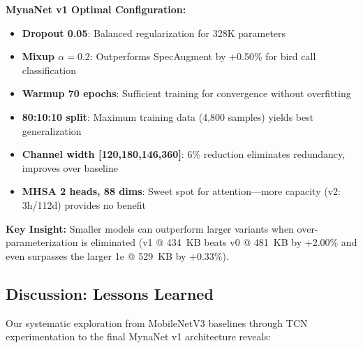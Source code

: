 \documentclass[conference]{IEEEtran}
\begin{document}
\noindent\textbf{MynaNet v1 Optimal Configuration:}
\begin{itemize}
    \item \textbf{Dropout 0.05}: Balanced regularization for 328K parameters
    \item \textbf{Mixup $\alpha=0.2$}: Outperforms SpecAugment by +0.50\% for bird call classification
    \item \textbf{Warmup 70 epochs}: Sufficient training for convergence without overfitting
    \item \textbf{80:10:10 split}: Maximum training data (4,800 samples) yields best generalization
    \item \textbf{Channel width [120,180,146,360]}: 6\% reduction eliminates redundancy, improves over baseline
    \item \textbf{MHSA 2 heads, 88 dims}: Sweet spot for attention—more capacity (v2: 3h/112d) provides no benefit
\end{itemize}

\noindent\textbf{Key Insight:} Smaller models can outperform larger variants when over-parameterization is eliminated (v1 @ 434~KB beats v0 @ 481~KB by +2.00\% and even surpasses the larger 1e @ 529~KB by +0.33\%).

\subsection{Discussion: Lessons Learned}
\label{sec:lessons}

Our systematic exploration from MobileNetV3 baselines through TCN experimentation to the final MynaNet v1 architecture reveals:
\end{document}

